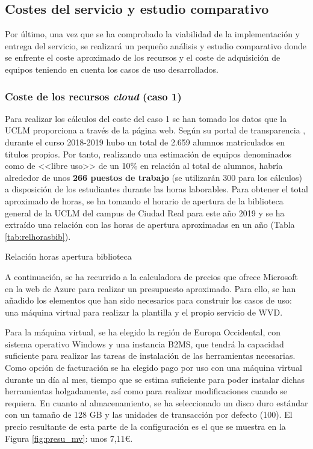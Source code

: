 \clearpage

\subsection{Costes del servicio y estudio comparativo}
Por último, una vez que se ha comprobado la viabilidad de la implementación y entrega del servicio, se realizará un pequeño análisis y estudio comparativo donde se enfrente el coste aproximado de los recursos y el coste de adquisición de equipos teniendo en cuenta los casos de uso desarrollados.

\subsubsection{Coste de los recursos \textit{cloud} (caso 1)}

Para realizar los cálculos del coste del caso 1 se han tomado los datos que la \acs{UCLM} proporciona a través de la página web. Según su portal de transparencia \cite{uclmstats}, durante el curso 2018-2019 hubo un total de 2.659 alumnos matriculados en títulos propios. Por tanto, realizando una estimación de equipos denominados como de <<libre uso>> de un 10\% en relación al total de alumnos, habría alrededor de unos \textbf{266 puestos de trabajo} (se utilizarán 300 para los cálculos) a disposición de los estudiantes durante las horas laborables. Para obtener el total aproximado de horas, se ha tomando el horario de apertura de la biblioteca general de la \acs{UCLM} del campus de Ciudad Real para este año 2019 \cite{horariobib} y se ha extraído una relación con las horas de apertura aproximadas en un año (Tabla \ref{tab:relhorasbib}).

\begin{table}[!htbp]
	\centering
	{\small
		
	}
	\caption[Relación horas apertura biblioteca]
	{Relación horas apertura biblioteca}
	\label{tab:relhorasbib}
\end{table}

\clearpage

A continuación, se ha recurrido a la calculadora de precios que ofrece Microsoft en la web de Azure \cite{calculadoraAzure} para realizar un presupuesto aproximado. Para ello, se han añadido los elementos que han sido necesarios para construir los casos de uso: una máquina virtual para realizar la plantilla y el propio servicio de \acs{WVD}.

Para la máquina virtual, se ha elegido la región de Europa Occidental, con sistema operativo Windows y una instancia B2MS, que tendrá la capacidad suficiente para realizar las tareas de instalación de las herramientas necesarias. Como opción de facturación se ha elegido pago por uso con una máquina virtual durante un día al mes, tiempo que se estima suficiente para poder instalar dichas herramientas holgadamente, así como para realizar modificaciones cuando se requiera. En cuanto al almacenamiento, se ha seleccionado un disco duro estándar con un tamaño de 128 \acs{GB} y las unidades de transacción por defecto (100). El precio resultante de esta parte de la configuración es el que se muestra en la Figura \ref{fig:presu_mv}: unos 7,11\euro{}.

